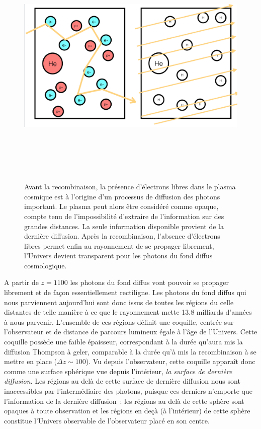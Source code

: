 \begin{figure}[htbp]
	\centering
		\includegraphics[height=12cm]{figs/diffusion.png}
	\caption{Avant la recombinaison, la présence d'électrons libres dans le plasma cosmique est à l'origine d'un processus de diffusion des photons important. Le plasma peut alors être considéré comme opaque, compte tenu de l'impossibilité d'extraire de l'information sur des grandes distances. La seule information disponible provient de la dernière diffusion. Après la recombinaison, l'absence d'électrons libres permet enfin au rayonnement de se propager librement, l'Univers devient transparent pour les photons du fond diffus cosmologique.}
	\label{f:diffusion}
\end{figure}

A partir de $z=1100$ les photons du fond diffus vont pouvoir se propager librement et de façon essentiellement rectiligne. Les photons du fond diffus qui nous parviennent aujourd'hui sont donc issus de toutes les régions du celle distantes de telle manière à ce que le rayonnement mette 13.8 milliards d'années à nous parvenir. L'ensemble de ces régions définit une coquille, centrée sur l'observateur et de distance de parcours lumineux égale à l'âge de l'Univers. Cette coquille possède une faible épaisseur, correspondant à la durée qu'aura mis la diffusion Thompson à geler, comparable à la durée qu'à mis la recombinaison à se mettre en place ($\Delta z\sim 100$). Vu depuis l'observateur, cette coquille apparaît donc comme une surface sphérique vue depuis l'intérieur, \textit{la surface de dernière diffusion}. Les régions au delà de cette surface de dernière diffusion nous sont inaccessibles par l'intermédiaire des photons, puisque ces derniers n'emporte que l'information de la dernière diffusion~: les régions au delà de cette sphère sont opaques à toute observation et les régions en deçà (à l'intérieur) de cette sphère constitue l'Univers observable de l'observateur placé en son centre.

